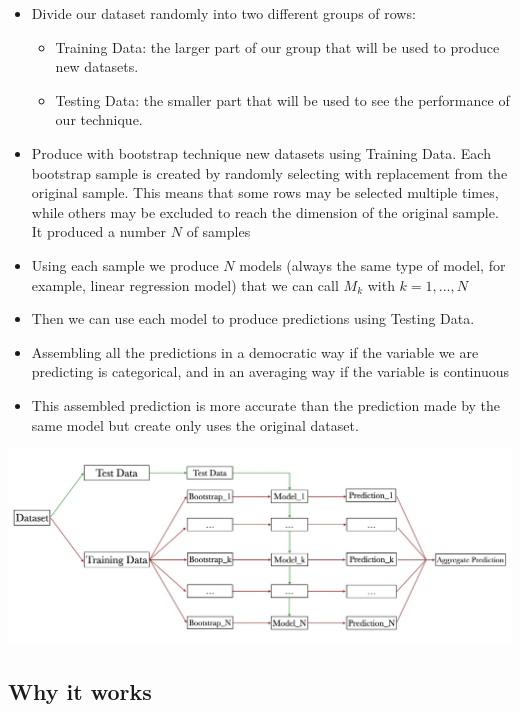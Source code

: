 \documentclass[
]{article}
\begin{document}
\begin{itemize}
    \item Divide our dataset randomly into two different groups of rows: 
    \begin{itemize}
        \item Training Data: the larger part of our group that will be used to produce new datasets.
        \item Testing Data: the smaller part that will be used to see the performance of our technique.
    \end{itemize}
    \item Produce with bootstrap technique new datasets using Training Data. Each bootstrap sample is created by randomly selecting with replacement from the original sample. This means that some rows may be selected multiple times, while others may be excluded to reach the dimension of the original sample. It produced a number $N$ of samples
    \item Using each sample we produce $N$ models (always the same type of model, for example, linear regression model) that we can call $M_k$ with $k={1, ..., N}$
    \item Then we can use each model to produce predictions using Testing Data.
    \item Assembling all the predictions in a democratic way if the variable we are predicting is categorical, and in an averaging way if the variable is continuous
    \item This assembled prediction is more accurate than the prediction made by the same model but create only uses the original dataset.
\end{itemize}

\begin{center}\includegraphics[width=1\linewidth]{Immagine WhatsApp 2023-06-16 ore 14.20.18} \end{center}

\hypertarget{why-it-works}{%
\subsection{Why it works}\label{why-it-works}}
\end{document}
